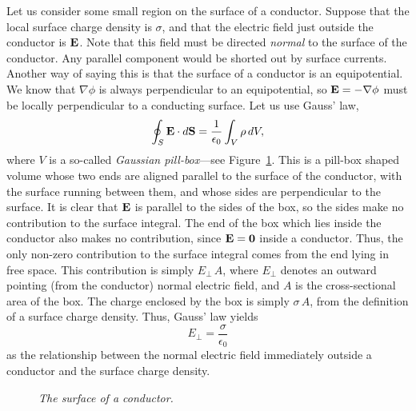 Let us consider some  small region on the surface of a conductor. Suppose that
the local surface charge density is $\sigma$, and that the electric field just outside
the conductor is ${\bf E}$. Note that this field must be directed {\em normal}
to the surface of the conductor. Any parallel component would be shorted out
by surface currents. Another way of saying this is that the surface of a conductor
is an equipotential. We know that $\nabla\phi$ is always perpendicular to 
an equipotential, so ${\bf E} = - \nabla\phi$ must be locally perpendicular
 to a conducting surface. Let us use Gauss' law,
\begin{equation}
\oint_S {\bf E} \cdot d{\bf S} = \frac{1}{\epsilon_0}\int_V \rho\, dV,
\end{equation}
where $V$ is  a so-called  {\em Gaussian pill-box}---see Figure~\ref{f42}. This is a pill-box shaped volume whose two ends are aligned parallel to the surface of the conductor,
with the surface running between them, and whose sides are perpendicular to the
surface.
It is clear that ${\bf E}$ is parallel to the sides of the box, so the sides
make no contribution to the surface integral. The end of the box  which lies
inside  the conductor also makes no contribution,
since ${\bf E} ={\bf  0}$ 
inside a conductor. Thus, the only non-zero contribution to the
surface integral comes from the end lying in free space. This contribution
is simply $E_\perp \,A$, where $E_\perp$ denotes an outward pointing (from the
conductor)  normal
electric field, and $A$ is the cross-sectional area of the box. 
The charge enclosed
by the box is simply $\sigma\,A$, from the definition of a surface charge density.
Thus, Gauss' law yields
\begin{equation}\label{e5.58}
E_\perp = \frac{\sigma}{\epsilon_0}
\end{equation}
as  the relationship between the normal electric field immediately outside a conductor
and the surface charge density.
\begin{figure}
\epsfysize=2.5in
\centerline{}
\caption{\em The surface of a conductor.}\label{f42}
\end{figure}


